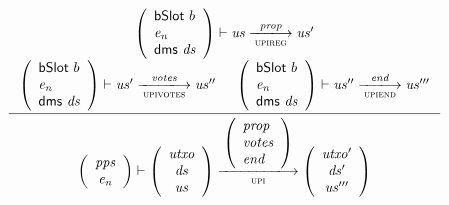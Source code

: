 \documentclass[11pt,a4paper]{article}
\newcommand{\var}[1]{\mathit{#1}}
\newcommand{\fun}[1]{\mathsf{#1}}
\newcommand{\trans}[2]{\xlongrightarrow[\textsc{#1}]{#2}}
\begin{document}
\begin{figure}[ht]
  \begin{equation*}
    \inference
    { {\left(
          \begin{array}{l}
            \bslot{b} \\
            \var{e_n} \\
            \fun{dms} ~ \var{ds}
          \end{array}
        \right)
      }
      \vdash \var{us} \trans{upireg}{\var{prop}} \var{us'}
      \\
      {\left(
          \begin{array}{l}
            \bslot{b} \\
            \var{e_n} \\
            \fun{dms} ~ \var{ds}
          \end{array}
        \right)}
      \vdash \var{us'} \trans{upivotes}{\var{votes}} \var{us''}
      &
      {\left(
          \begin{array}{l}
            \bslot{b} \\
            \var{e_n} \\
            \fun{dms} ~ \var{ds}
          \end{array}
        \right)}
      \vdash \var{us''} \trans{upiend}{\var{end}} \var{us'''}
    }
    {
      \left(
        {\begin{array}{c}
           \var{pps} \\
           \var{e_n}
         \end{array}}
     \right)
     \vdash
     {
       \left(
         {\begin{array}{c}
            \var{utxo} \\
            \var{ds} \\
            \var{us}
          \end{array}}
      \right)
    }
    \trans{upi}
    {
      \left(
        \begin{array}{l}
          \var{prop} \\
          \var{votes} \\
          \var{end}
        \end{array}
      \right)
    }
    {
      \left(
        {\begin{array}{c}
           \var{utxo'} \\
           \var{ds'} \\
           \var{us'''}
         \end{array}}
     \right)
   }
 }
\end{equation*}

\end{figure}
\end{document}
